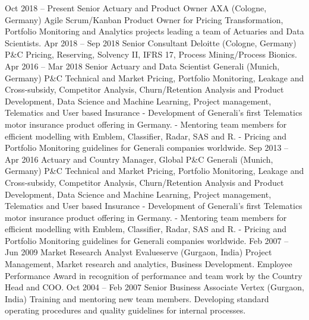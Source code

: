\documentclass[
	a4paper,
]{fortysecondscv}
\begin{document}
\makefrontsidebar


	\begin{cvtable}[3]
		\cvitem
			{Oct 2018 -- Present}
			{Senior Actuary and Product Owner}
			{AXA (Cologne, Germany)}
			{
				Agile Scrum/Kanban Product Owner for Pricing Transformation, Portfolio Monitoring and Analytics projects leading a team of Actuaries and Data Scientists.
			}
		\cvitem
			{Apr 2018 -- Sep 2018}
			{Senior Consultant}
			{Deloitte (Cologne, Germany)}
			{
				P\&C Pricing, Reserving, Solvency II, IFRS 17, Process Mining/Process Bionics.
			}
		\cvitem
			{Apr 2016 -- Mar 2018}
			{Senior Actuary and Data Scientist}
			{Generali (Munich, Germany)}
			{
				P\&C Technical and Market Pricing, Portfolio Monitoring, Leakage and Cross-subsidy, Competitor Analysis, Churn/Retention Analysis and Product Development, Data Science and Machine Learning, Project management, Telematics and User based Insurance
				- Development of Generali’s first Telematics motor insurance product offering in Germany.
				- Mentoring team members for efficient modelling with Emblem, Classifier, Radar, SAS and R.
				- Pricing and Portfolio Monitoring guidelines for Generali companies worldwide.
			}
		\cvitem
			{Sep 2013 -- Apr 2016}
			{Actuary and Country Manager, Global P\&C}
			{Generali (Munich, Germany)}
			{
				P\&C Technical and Market Pricing, Portfolio Monitoring, Leakage and Cross-subsidy, Competitor Analysis, Churn/Retention Analysis and Product Development, Data Science and Machine Learning, Project management, Telematics and User based Insurance
				- Development of Generali’s first Telematics motor insurance product offering in Germany.
				- Mentoring team members for efficient modelling with Emblem, Classifier, Radar, SAS and R.
				- Pricing and Portfolio Monitoring guidelines for Generali companies worldwide.
			}
		\cvitem
			{Feb 2007 -- Jun 2009}
			{Market Research Analyst}
			{Evalueserve (Gurgaon, India)}
			{
				Project Management, Market research and analytics, Business Development.
				Employee Performance Award in recognition of performance and team work by the Country Head and COO.
			}
		\cvitem
			{Oct 2004 -- Feb 2007}
			{Senior Business Associate}
			{Vertex (Gurgaon, India)}
			{
				Training and mentoring new team members. 
				Developing standard operating procedures and quality guidelines for internal processes.
			}
	\end{cvtable}
\end{document}
